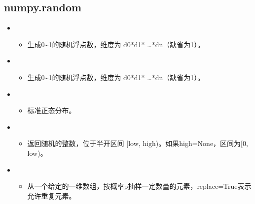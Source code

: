 \documentclass[letterpaper,10pt,english]{sphinxmanual}
\begin{document}
\subsection{numpy.random}
\label{\detokenize{python/09_random:numpy-random}}
%
\begin{sphinxVerbatim}[commandchars=\\\{\}]
   
\end{sphinxVerbatim}
\begin{itemize}
\item {} 
\begin{itemize}
\item {} 
生成0\textasciitilde{}1的随机浮点数，维度为 d0*d1* …*dn（缺省为1）。

\end{itemize}

\item {} 
\begin{itemize}
\item {} 
生成0\textasciitilde{}1的随机浮点数，维度为 d0*d1* …*dn（缺省为1）。

\end{itemize}

\item {} 
\begin{itemize}
\item {} 
标准正态分布。

\end{itemize}

\item {} 
\begin{itemize}
\item {} 
返回随机的整数，位于半开区间 {[}low, high)。如果high=None，区间为{[}0, low)。

\end{itemize}

\item {} 
\begin{itemize}
\item {} 
从一个给定的一维数组，按概率p抽样一定数量的元素，replace=True表示允许重复元素。

\end{itemize}


\end{itemize}
\end{document}
